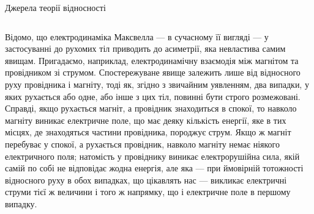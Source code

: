 \documentclass[9pt]{beamer}
\begin{document}
\begin{frame}{Джерела теорії відносності}{}
\begin{columns}
\begin{column}{0.45\linewidth}
\begin{block}{}
				\hspace*{2em}Відомо, що {\color{red}електродинаміка Максвелла --- в сучасному її вигляді --- у застосуванні до рухомих тіл приводить до асиметрії, яка невластива самим явищам}. Пригадаємо, наприклад, електродинамічну взаємодія між магнітом та провідником зі струмом. {\color{red}Спостережуване явище залежить лише від відносного руху провідника і магніту, тоді як, згідно з звичайним уявленням, два випадки, у яких рухається або одне, або інше з цих тіл, повинні бути строго розмежовані}. Справді, {\color{blue}якщо рухається магніт, а провідник знаходиться в спокої, то навколо магніту виникає електричне поле}, що має деяку кількість енергії, яке в тих місцях, де знаходяться частини провідника, породжує струм. {\color{blue}Якщо ж магніт перебуває у спокої, а рухається провідник, навколо магніту немає ніякого електричного поля}; натомість у провіднику виникає електрорушійна сила, якій самій по собі не відповідає жодна енергія, але яка --- при ймовірній тотожності відносного руху в обох випадках, що цікавлять нас --- викликає електричні струми тієї ж величини і того ж напрямку, що і електричне поле в першому випадку.
			\end{block}
		\end{column}
	\end{columns}
\end{frame}
\end{document}

